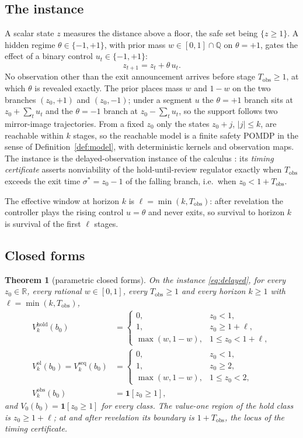 \documentclass[11pt,a4paper]{article}
\theoremstyle{plain}
\newtheorem{theorem}{Theorem}[section]
\theoremstyle{definition}
\theoremstyle{remark}
\newcommand{\R}{\mathbb{R}}
\newcommand{\Qr}{\mathbb{Q}}
\newcommand{\hold}{\mathrm{hold}}
\newcommand{\ol}{\mathrm{ol}}
\newcommand{\seq}{\mathrm{seq}}
\newcommand{\obs}{\mathrm{obs}}
\newcommand{\Tobs}{T_{\mathrm{obs}}}
\newcommand{\ind}[1]{\mathbf{1}[#1]}
\begin{document}
\subsection{The instance}

A scalar state $z$ measures the distance above a floor, the safe set being $\{z\ge1\}$. A hidden regime $\theta\in\{-1,+1\}$, with prior mass $w\in[0,1]\cap\Qr$ on $\theta=+1$, gates the effect of a binary control $u_t\in\{-1,+1\}$:
\begin{equation}\label{eq:delayed}
z_{t+1}=z_t+\theta\,u_t .
\end{equation}
No observation other than the exit announcement arrives before stage $\Tobs\ge1$, at which $\theta$ is revealed exactly. The prior places mass $w$ and $1-w$ on the two branches $(z_0,+1)$ and $(z_0,-1)$; under a segment $u$ the $\theta=+1$ branch sits at $z_0+\sum_t u_t$ and the $\theta=-1$ branch at $z_0-\sum_t u_t$, so the support follows two mirror-image trajectories. From a fixed $z_0$ only the states $z_0+j$, $|j|\le k$, are reachable within $k$ stages, so the reachable model is a finite safety POMDP in the sense of Definition~\ref{def:model}, with deterministic kernels and observation maps. The instance is the delayed-observation instance of the calculus \cite{Abaee2026calc}: its \emph{timing certificate} asserts nonviability of the hold-until-review regulator exactly when $\Tobs$ exceeds the exit time $\sigma^{*}=z_0-1$ of the falling branch, i.e.\ when $z_0<1+\Tobs$.

The effective window at horizon $k$ is $\ell=\min(k,\Tobs)$: after revelation the controller plays the rising control $u=\theta$ and never exits, so survival to horizon $k$ is survival of the first $\ell$ stages.

\subsection{Closed forms}

\begin{theorem}[parametric closed forms]\label{thm:closed}
On the instance \eqref{eq:delayed}, for every $z_0\in\R$, every rational $w\in[0,1]$, every $\Tobs\ge1$ and every horizon $k\ge1$ with $\ell=\min(k,\Tobs)$,
\begin{align}
V^{\hold}_k(b_0)&=\begin{cases}0,&z_0<1,\\ 1,&z_0\ge1+\ell,\\ \max(w,1-w),&1\le z_0<1+\ell,\end{cases}\label{eq:hold}\\[2pt]
V^{\ol}_k(b_0)=V^{\seq}_k(b_0)&=\begin{cases}0,&z_0<1,\\ 1,&z_0\ge2,\\ \max(w,1-w),&1\le z_0<2,\end{cases}\label{eq:ol}\\[2pt]
V^{\obs}_k(b_0)&=\ind{z_0\ge1},\label{eq:obs}
\end{align}
and $V_0(b_0)=\ind{z_0\ge1}$ for every class. The value-one region of the hold class is $z_0\ge1+\ell$; at and after revelation its boundary is $1+\Tobs$, the locus of the timing certificate.
\end{theorem}
\end{document}
